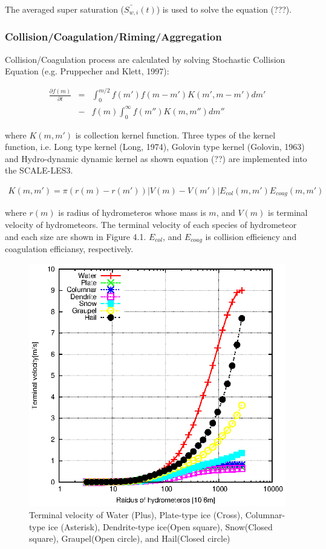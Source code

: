 The averaged super saturation ($\bar{S_{w,i}}(t)$) is used to solve the equation (???).

\subsubsection{Collision/Coagulation/Riming/Aggregation}
Collision/Coagulation process are calculated by solving Stochastic Collision Equation (e.g. Pruppecher and Klett, 1997):

\begin{eqnarray}
\frac{\partial f(m)}{\partial t}&=&\int_0^{m/2}f(m')f(m-m')K(m',m-m')dm' \nonumber\\
&-&f(m)\int_0^{\infty}f(m'')K(m,m'')dm''
\end{eqnarray}

where $K(m,m')$ is collection kernel function. Three types of the kernel function, i.e. Long type kernel (Long, 1974), Golovin type kernel (Golovin, 1963) and Hydro-dynamic dynamic kernel as shown equation (??) are implemented into the SCALE-LES3.

\begin{eqnarray}
K(m,m')=\pi(r(m)-r(m'))\left| V(m)-V(m')\right |E_{col}(m,m')E_{coag}(m,m')
\end{eqnarray}

where $r(m)$ is radius of hydrometeros whose mass is $m$, and $V(m)$ is terminal velocity of hydrometeors. The terminal velocity of each species of hydrometeor and each size are shown in Figure 4.1. $E_{col}$, and $E_{coag}$ is collision effieiency and coagulation efficiansy, respectively.\\ 

\begin{figure}[h]
\begin{center}
\includegraphics[scale=0.9]{./figure/terminal-velocity.eps}
\end{center}
\caption{Terminal velocity of Water (Plus), Plate-type ice (Cross), Columnar-type ice (Asterisk), Dendrite-type ice(Open square), Snow(Closed square), Graupel(Open circle), and Hail(Closed circle)} 
\end{figure}


